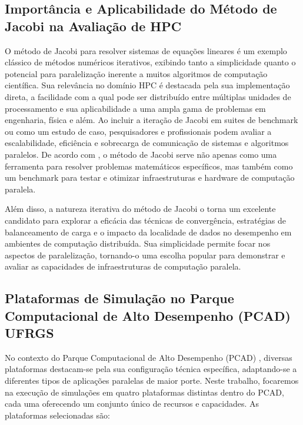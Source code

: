 \documentclass[ppgc,diss]{iiufrgs}
\begin{document}
\subsection{Importância e Aplicabilidade do Método de Jacobi na Avaliação de HPC}
O método de Jacobi para resolver sistemas de equações lineares é um exemplo clássico de métodos numéricos iterativos, exibindo tanto a simplicidade quanto o potencial para paralelização inerente a muitos algoritmos de computação científica. Sua relevância no domínio HPC é destacada pela sua implementação direta, a facilidade com a qual pode ser distribuído entre múltiplas unidades de processamento e sua aplicabilidade a uma ampla gama de problemas em engenharia, física e além. Ao incluir a iteração de Jacobi em suites de benchmark ou como um estudo de caso, pesquisadores e profissionais podem avaliar a escalabilidade, eficiência e sobrecarga de comunicação de sistemas e algoritmos paralelos. De acordo com , o método de Jacobi serve não apenas como uma ferramenta para resolver problemas matemáticos específicos, mas também como um benchmark para testar e otimizar infraestruturas e hardware de computação paralela.

Além disso, a natureza iterativa do método de Jacobi o torna um excelente candidato para explorar a eficácia das técnicas de convergência, estratégias de balanceamento de carga e o impacto da localidade de dados no desempenho em ambientes de computação distribuída. Sua simplicidade permite focar nos aspectos de paralelização, tornando-o uma escolha popular para demonstrar e avaliar as capacidades de infraestruturas de computação paralela.

\subsection{Plataformas de Simulação no Parque Computacional de Alto Desempenho (PCAD) UFRGS}

No contexto do Parque Computacional de Alto Desempenho (PCAD) \citep{PCAD2023}, diversas plataformas destacam-se pela sua configuração técnica específica, adaptando-se a diferentes tipos de aplicações paralelas de maior porte. Neste trabalho, focaremos na execução de simulações em quatro plataformas distintas dentro do PCAD, cada uma oferecendo um conjunto único de recursos e capacidades. As plataformas selecionadas são:
\end{document}
